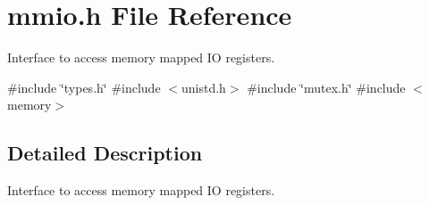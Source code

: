 \section{mmio.\+h File Reference}
\label{mmio_8h}


Interface to access memory mapped IO registers.  


{\ttfamily \#include \char`\"{}types.\+h\char`\"{}}\newline
{\ttfamily \#include $<$unistd.\+h$>$}\newline
{\ttfamily \#include \char`\"{}mutex.\+h\char`\"{}}\newline
{\ttfamily \#include $<$memory$>$}\newline


\subsection{Detailed Description}
Interface to access memory mapped IO registers. 

